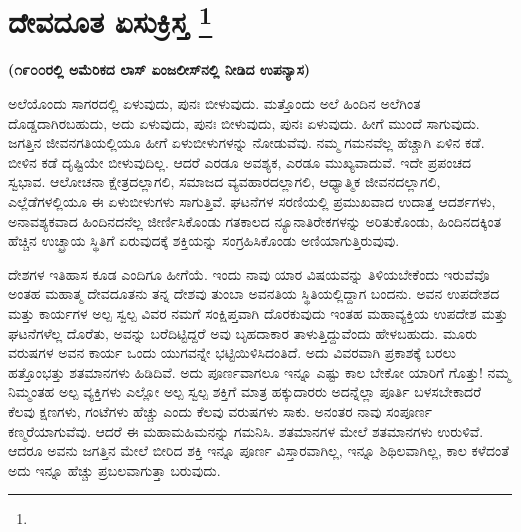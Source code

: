 
\chapter[ದೇವದೂತ ಏಸುಕ್ರಿಸ್ತ ]{ದೇವದೂತ ಏಸುಕ್ರಿಸ್ತ \protect\footnote{}}

\centerline{\textbf{(೧೯೦೦ರಲ್ಲಿ ಅಮೆರಿಕದ ಲಾಸ್​ ಏಂಜಲೀಸ್​ನಲ್ಲಿ ನೀಡಿದ ಉಪನ್ಯಾಸ)}}

ಅಲೆಯೊಂದು ಸಾಗರದಲ್ಲಿ ಏಳುವುದು, ಪುನಃ ಬೀಳುವುದು. ಮತ್ತೊಂದು ಅಲೆ ಹಿಂದಿನ ಅಲೆಗಿಂತ ದೊಡ್ಡದಾಗಿರಬಹುದು, ಅದು ಏಳುವುದು, ಪುನಃ ಬೀಳುವುದು, ಪುನಃ ಏಳುವುದು. ಹೀಗೆ ಮುಂದೆ ಸಾಗುವುದು. ಜಗತ್ತಿನ ಜೀವನಗತಿಯಲ್ಲಿಯೂ ಹೀಗೆ ಏಳುಬೀಳುಗಳನ್ನು ನೋಡುವೆವು. ನಮ್ಮ ಗಮನವೆಲ್ಲ ಹೆಚ್ಚಾಗಿ ಏಳಿನ ಕಡೆ. ಬೀಳಿನ ಕಡೆ ದೃಷ್ಟಿಯೇ ಬೀಳುವು\-ದಿಲ್ಲ. ಆದರೆ ಎರಡೂ ಅವಶ್ಯಕ, ಎರಡೂ ಮುಖ್ಯವಾದುವೆ. ಇದೇ ಪ್ರಪಂಚದ ಸ್ವಭಾವ. ಆಲೋಚನಾ ಕ್ಷೇತ್ರದಲ್ಲಾಗಲಿ, ಸಮಾಜದ ವ್ಯವಹಾರದಲ್ಲಾಗಲಿ, ಆಧ್ಯಾತ್ಮಿಕ ಜೀವನದಲ್ಲಾಗಲಿ, ಎಲ್ಲೆಡೆಗಳಲ್ಲಿಯೂ ಈ ಏಳುಬೀಳುಗಳು ಸಾಗುತ್ತಿವೆ. ಘಟನೆಗಳ ಸರಣಿಯಲ್ಲಿ ಪ್ರಮುಖವಾದ ಉದಾತ್ತ ಆದರ್ಶಗಳು, ಅನಾವಶ್ಯಕವಾದ ಹಿಂದಿನದನೆಲ್ಲ ಜೀರ್ಣಿಸಿಕೊಂಡು ಗತಕಾಲದ ನ್ಯೂನಾತಿರೇಕಗಳನ್ನು ಅರಿತುಕೊಂಡು, ಹಿಂದಿನದಕ್ಕಿಂತ ಹೆಚ್ಚಿನ ಉಚ್ಛ್ರಾಯ ಸ್ಥಿತಿಗೆ ಏರುವುದಕ್ಕೆ ಶಕ್ತಿಯನ್ನು ಸಂಗ್ರಹಿಸಿಕೊಂಡು ಅಣಿಯಾಗು\-ತ್ತಿರುವುವು.

ದೇಶಗಳ ಇತಿಹಾಸ ಕೂಡ ಎಂದಿಗೂ ಹೀಗೆಯೆ. ಇಂದು ನಾವು ಯಾರ ವಿಷಯವನ್ನು ತಿಳಿಯಬೇಕೆಂದು ಇರುವೆವೊ ಅಂತಹ ಮಹಾತ್ಮ ದೇವದೂತನು ತನ್ನ ದೇಶವು ತುಂಬಾ ಅವನತಿಯ ಸ್ಥಿತಿಯಲ್ಲಿದ್ದಾಗ ಬಂದನು. ಅವನ ಉಪದೇಶದ ಮತ್ತು ಕಾರ್ಯಗಳ ಅಲ್ಪ ಸ್ವಲ್ಪ ವಿವರ ನಮಗೆ ಸಂಕ್ಷಿಪ್ತವಾಗಿ ದೊರಕುವುದು ಇಂತಹ ಮಹಾವ್ಯಕ್ತಿಯ ಉಪದೇಶ ಮತ್ತು ಘಟನೆಗಳೆಲ್ಲ ದೊರೆತು, ಅವನ್ನು ಬರೆದಿಟ್ಟಿದ್ದರೆ ಅವು ಬೃಹದಾಕಾರ ತಾಳುತ್ತಿದ್ದುವೆಂದು ಹೇಳಬಹುದು. ಮೂರು ವರುಷಗಳ ಅವನ ಕಾರ್ಯ ಒಂದು ಯುಗವನ್ನೇ ಭಟ್ಟಿಯಿಳಿಸಿದಂತಿದೆ. ಅದು ವಿವರವಾಗಿ ಪ್ರಕಾಶಕ್ಕೆ ಬರಲು ಹತ್ತೊಂಭತ್ತು ಶತಮಾನಗಳು ಹಿಡಿದಿವೆ. ಅದು ಪೂರ್ಣವಾಗಲೂ ಇನ್ನೂ ಎಷ್ಟು ಕಾಲ ಬೇಕೋ ಯಾರಿಗೆ ಗೊತ್ತು! ನಮ್ಮ ನಿಮ್ಮಂತಹ ಅಲ್ಪ ವ್ಯಕ್ತಿಗಳು ಎಲ್ಲೋ ಅಲ್ಪ ಸ್ವಲ್ಪ ಶಕ್ತಿಗೆ ಮಾತ್ರ ಹಕ್ಕುದಾರರು ಅದನ್ನೆಲ್ಲಾ ಪೂರ್ತಿ ಬಳಸಬೇಕಾದರೆ ಕೆಲವು ಕ್ಷಣಗಳು, ಗಂಟೆಗಳು ಹೆಚ್ಚು ಎಂದು ಕೆಲವು ವರುಷಗಳು ಸಾಕು. ಅನಂತರ ನಾವು ಸಂಪೂರ್ಣ ಕಣ್ಮರೆಯಾಗುವೆವು. ಆದರೆ ಈ ಮಹಾಮಹಿಮನನ್ನು ಗಮನಿಸಿ. ಶತಮಾನಗಳ ಮೇಲೆ ಶತಮಾನಗಳು ಉರುಳಿವೆ. ಆದರೂ ಅವನು ಜಗತ್ತಿನ ಮೇಲೆ ಬೀರಿದ ಶಕ್ತಿ ಇನ್ನೂ ಪೂರ್ಣ ವಿಸ್ತಾರವಾಗಿಲ್ಲ, ಇನ್ನೂ ಶಿಥಿಲವಾಗಿಲ್ಲ, ಕಾಲ ಕಳೆದಂತೆ ಅದು ಇನ್ನೂ ಹೆಚ್ಚು ಪ್ರಬಲವಾಗುತ್ತಾ ಬರುವುದು.

